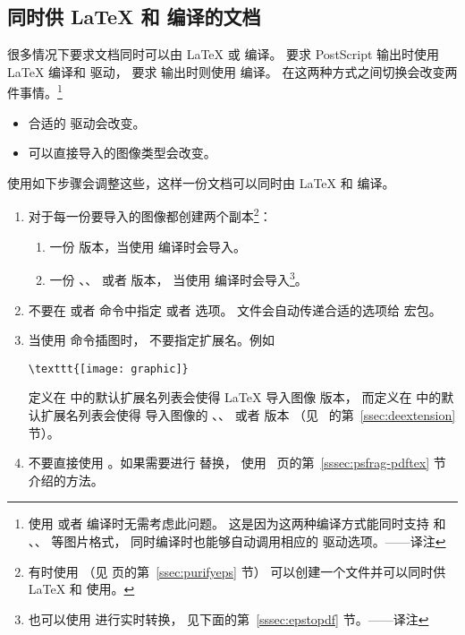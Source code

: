 \subsection{同时供 \LaTeX{} 和 \pdfLaTeX{} 编译的文档 }\label{ssec:latexandpdflatex}
很多情况下要求文档同时可以由 \LaTeX{} 或 \pdfLaTeX{} 编译。
要求 PostScript 输出时使用 \LaTeX{} 编译和  驱动，
要求  输出时则使用 \pdfLaTeX{} 编译。
在这两种方式之间切换会改变两件事情。\footnote{
    使用  或者  编译时无需考虑此问题。
	这是因为这两种编译方式能同时支持  和 、、 等图片格式，
	同时编译时也能够自动调用相应的  驱动选项。——译注}
\begin{itemize}
	\item 合适的  驱动会改变。
	\item 可以直接导入的图像类型会改变。
\end{itemize}
使用如下步骤会调整这些，这样一份文档可以同时由 \LaTeX{} 和 \pdfLaTeX{} 编译。
\begin{enumerate}
	\item 对于每一份要导入的图像都创建两个副本\footnote{
		有时使用  （见 \pageref{ssec:purifyeps} 页的第~\ref{ssec:purifyeps} 节） 可以创建一个文件并可以同时供 \LaTeX{} 和 \pdfLaTeX{} 使用。}：
	\begin{enumerate}
		\item 一份  版本，当使用  编译时会导入。
		\item 一份 、、 或者 \MetaPost{} 版本，
		当使用  编译时会导入\footnote{
			也可以使用  进行实时转换，
			见下面的第~\ref{sssec:epstopdf} 节。——译注}。
	\end{enumerate}
	
	\item 不要在  或者  命令中指定  或者  选项。
	 文件会自动传递合适的选项给  宏包。
	
	\item 当使用  命令插图时，
	不要指定扩展名。例如
\begin{lstlisting}
\texttt{[image: graphic]}
\end{lstlisting}
	定义在  中的默认扩展名列表会使得 \LaTeX{} 导入图像  版本，
	而定义在  中的默认扩展名列表会使得 \pdfLaTeX{} 导入图像的 、、 或者 \MetaPost{} 版本
	（见~\pageref{ssec:deextension} 的第~\ref{ssec:deextension} 节）。
	
	\item 不要直接使用 。如果需要进行  替换，
	使用~\pageref{sssec:psfrag-pdftex} 页的第~\ref{sssec:psfrag-pdftex} 节介绍的方法。
\end{enumerate}

